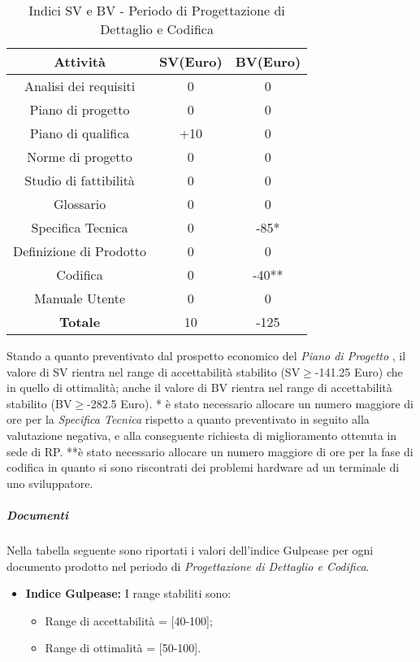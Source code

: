        
      \begin{table}[H]
        \centering
        \begin{tabular}{|c|c|c|}
          \hline
          \textbf{Attività} & \textbf{SV}(Euro)  & \textbf{BV}(Euro) \\
          \hline
          Analisi dei requisiti  & 0 & 0  \\
          Piano di progetto & 0 & 0\\
          Piano di qualifica  & +10  & 0\\
          Norme di progetto & 0  & 0 \\
          Studio di fattibilità & 0  & 0  \\
          Glossario & 0  & 0  \\
          Specifica Tecnica & 0 & -85*\\
          Definizione di Prodotto & 0 & 0\\
          Codifica & 0 & -40**\\
          Manuale Utente & 0 & 0\\
          \hline
          \textbf{Totale} & 10  & -125  \\
          \hline
        \end{tabular}
        \caption{Indici SV e BV - Periodo di Progettazione di Dettaglio e Codifica}
      \end{table}
      Stando a quanto preventivato dal prospetto economico del \emph{Piano di Progetto \VersionePP{}}, il valore di SV rientra nel range di accettabilità stabilito (SV\(\geq\)-141.25 Euro) che in quello di ottimalità;
      anche il valore di BV rientra nel range di accettabilità stabilito (BV\(\geq\)-282.5 Euro).
      * è stato necessario allocare un numero maggiore di ore per la \emph{Specifica Tecnica} rispetto a quanto preventivato in seguito alla valutazione negativa, e alla conseguente richiesta di miglioramento ottenuta in sede di RP.
      **è stato necessario allocare un numero maggiore di ore per la fase di codifica in quanto si sono riscontrati dei problemi hardware ad un terminale di uno sviluppatore.
      
      
      \subparagraph{Documenti}
      Nella tabella seguente sono riportati i valori dell'indice Gulpease per ogni documento prodotto nel periodo di \textit{Progettazione di Dettaglio e Codifica}.\\

\begin{itemize}
\item \textbf{Indice Gulpease: }I range stabiliti sono:
      \begin{itemize}
        \item Range di accettabilità = [40-100];
        \item Range di ottimalità = [50-100].
      \end{itemize}
\end{itemize}      
      

